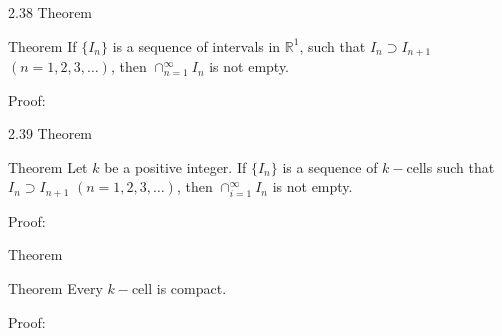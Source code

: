 \documentclass{beamer}
\begin{document}
\begin{frame}{2.38 Theorem}
\begin{block}{Theorem}
If \(\{I_n\}\) is a sequence of intervals in \(\mathbb{R}^1\), such that \(I_n \supset I_{n+1}\) \((n=1,2,3,\dots)\), then \(\cap_{n=1}^\infty I_n\) is not empty. 
\end{block}
\begin{block}{Proof:}

\end{block}
\end{frame}

\begin{frame}{2.39 Theorem}
\begin{block}{Theorem}
Let \(k\) be a positive integer. If \(\{I_n\}\) is a sequence of \(k-\)cells such that \(I_n \supset I_{n+1}\) \((n=1,2,3,\dots)\), then \(\cap_{i=1}^\infty I_n\) is not empty. 
\end{block}
\begin{block}{Proof:}

\end{block}
\end{frame}

\begin{frame}{Theorem}
\begin{block}{Theorem}
Every \(k-\)cell is compact.
\end{block}
\begin{block}{Proof:}

\end{block}
\end{frame}
\end{document}
